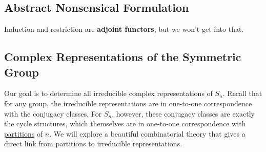 \documentclass[12pt]{article}
\theoremstyle{definition}
\begin{document}
\subsection{Abstract Nonsensical Formulation}
Induction and restriction are \textbf{adjoint functors}, but we won't get into that.
\subsection{Complex Representations of the Symmetric Group}
Our goal is to determine all irreducible complex representations of $S_n$. Recall that for any group, the irreducible representations are in one-to-one correspondence with the conjugacy classes. For $S_n$, however, these conjugacy classes are exactly the cycle structures, which themselves are in one-to-one correspondence with \underline{partitions} of $n$. We will explore a beautiful combinatorial theory that gives a direct link from partitions to irreducible representations.
\end{document}
